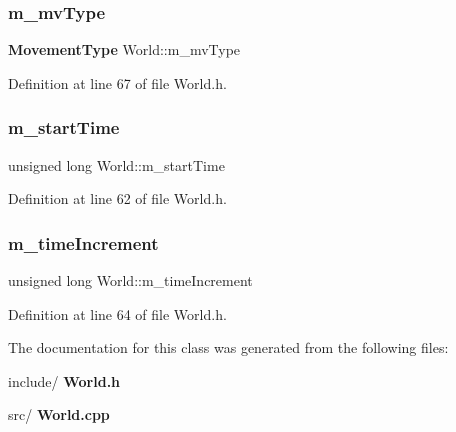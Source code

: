 \subsubsection{m\_mvType}
{\footnotesize\ttfamily \textbf{ Movement\+Type} World\+::m\+\_\+mv\+Type\hspace{0.3cm}{\ttfamily [private]}}



Definition at line 67 of file World.\+h.

\mbox{\label{class_world_a5b46814e7da7222730be62154bf10008}} 
\subsubsection{m\_startTime}
{\footnotesize\ttfamily unsigned long World\+::m\+\_\+start\+Time\hspace{0.3cm}{\ttfamily [private]}}



Definition at line 62 of file World.\+h.

\mbox{\label{class_world_a97f773548fef49eb408115c097aa995d}} 
\subsubsection{m\_timeIncrement}
{\footnotesize\ttfamily unsigned long World\+::m\+\_\+time\+Increment\hspace{0.3cm}{\ttfamily [private]}}



Definition at line 64 of file World.\+h.



The documentation for this class was generated from the following files\+:\begin{DoxyCompactItemize}
\item 
include/\textbf{ World.\+h}\item 
src/\textbf{ World.\+cpp}\end{DoxyCompactItemize}
